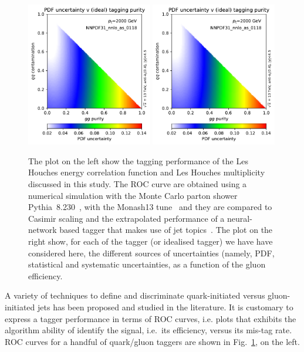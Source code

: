 \begin{figure}
\begin{center}
\includegraphics[width=0.49\textwidth, page=4]{figs/performance-plots.pdf} \hfill
\includegraphics[width=0.49\textwidth, page=5]{figs/performance-plots.pdf}
\caption{The plot on the left show the tagging performance of the Les Houches energy correlation function and Les Houches multiplicity discussed in this study. 
The ROC curve are obtained using a numerical simulation with the Monte Carlo parton shower Pythia~8.230~\cite{Sjostrand:2014zea}, with the Monash13 tune~\cite{Skands:2014pea} and they are compared to Casimir scaling and the extrapolated performance of a neural-network based tagger that makes use of jet topics~\cite{Metodiev:2018ftz,Komiske:2018vkc}.
The plot on the right show, for each of the tagger (or idealised tagger) we have have considered here, the different sources of uncertainties (namely, PDF, statistical and systematic uncertainties, as a function of the gluon efficiency. 
}
\label{fig:performance_studies} 
\end{center}
\end{figure}
A variety of techniques to define and discriminate quark-initiated versus gluon-initiated jets has been proposed and studied in the literature. It is customary to express a tagger performance in terms of ROC curves, i.e. plots that exhibits the algorithm ability of identify the signal, i.e.\ its efficiency, versus its mis-tag rate. ROC curves for a handful of quark/gluon taggers are shown in Fig.~\ref{fig:performance_studies}, on the left.
